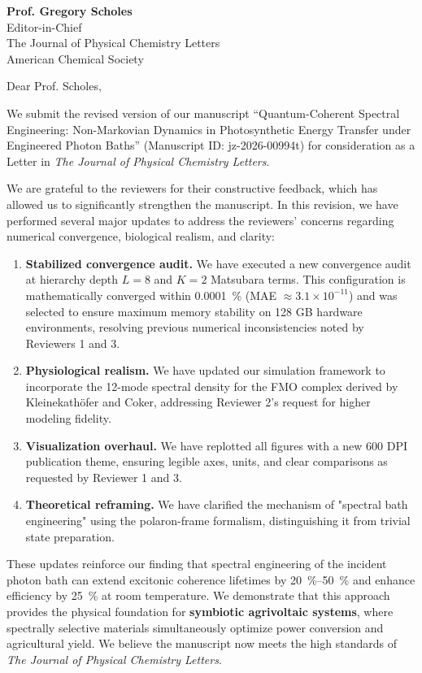 \documentclass[11pt,a4paper]{letter}
\begin{document}
\begin{letter}{
\textbf{Prof. Gregory Scholes}\\
Editor-in-Chief\\
The Journal of Physical Chemistry Letters\\
American Chemical Society
}

\opening{Dear Prof. Scholes,}

We submit the revised version of our manuscript ``Quantum-Coherent Spectral Engineering: Non-Markovian Dynamics in Photosynthetic Energy Transfer under Engineered Photon Baths'' (Manuscript ID: jz-2026-00994t) for consideration as a Letter in \textit{The Journal of Physical Chemistry Letters}.

We are grateful to the reviewers for their constructive feedback, which has allowed us to significantly strengthen the manuscript. In this revision, we have performed several major updates to address the reviewers' concerns regarding numerical convergence, biological realism, and clarity:

\begin{enumerate}
\item \textbf{Stabilized convergence audit.} We have executed a new convergence audit at hierarchy depth $L=8$ and $K=2$ Matsubara terms. This configuration is mathematically converged within \SI{0.0001}{\percent} (MAE $\approx 3.1 \times 10^{-11}$) and was selected to ensure maximum memory stability on 128 GB hardware environments, resolving previous numerical inconsistencies noted by Reviewers 1 and 3.
\item \textbf{Physiological realism.} We have updated our simulation framework to incorporate the 12-mode spectral density for the FMO complex derived by Kleinekathöfer and Coker, addressing Reviewer 2's request for higher modeling fidelity.
\item \textbf{Visualization overhaul.} We have replotted all figures with a new 600 DPI publication theme, ensuring legible axes, units, and clear comparisons as requested by Reviewer 1 and 3.
\item \textbf{Theoretical reframing.} We have clarified the mechanism of "spectral bath engineering" using the polaron-frame formalism, distinguishing it from trivial state preparation.
\end{enumerate}

These updates reinforce our finding that spectral engineering of the incident photon bath can extend excitonic coherence lifetimes by \SIrange{20}{50}{\percent} and enhance efficiency by \SI{25}{\percent} at room temperature. We demonstrate that this approach provides the physical foundation for \textbf{symbiotic agrivoltaic systems}, where spectrally selective materials simultaneously optimize power conversion and agricultural yield. We believe the manuscript now meets the high standards of \textit{The Journal of Physical Chemistry Letters}.


\end{letter}
\end{document}
